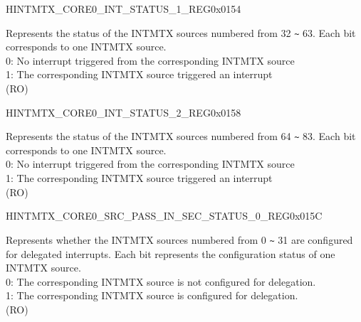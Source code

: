 \begin{register}{H}{INTMTX\_CORE0\_INT\_STATUS\_1\_REG}{0x0154}\label{regdesc:INTMTXCORE0INTSTATUS1REG}
%
\regnewline%
\begin{regdesc}\begin{reglist}
\label{fielddesc:INTMTXCORE0INTSTATUS1}\item [INTMTX\_CORE0\_INT\_STATUS\_1] Represents the status of the INTMTX sources numbered from 32 \verb+~+ 63. Each bit corresponds to one INTMTX source.\\
0: No interrupt triggered from the corresponding INTMTX source \\
1: The corresponding INTMTX source triggered an interrupt \\(RO)
\end{reglist}\end{regdesc}
\end{register}


\begin{register}{H}{INTMTX\_CORE0\_INT\_STATUS\_2\_REG}{0x0158}\label{regdesc:INTMTXCORE0INTSTATUS2REG}
%
%
\regnewline%
\begin{regdesc}\begin{reglist}
\label{fielddesc:INTMTXCORE0INTSTATUS2}\item [INTMTX\_CORE0\_INT\_STATUS\_2] Represents the status of the INTMTX sources numbered from 64 \verb+~+ 83. Each bit corresponds to one INTMTX source.\\
0: No interrupt triggered from the corresponding INTMTX source \\
1: The corresponding INTMTX source triggered an interrupt \\(RO)
\end{reglist}\end{regdesc}
\end{register}


\begin{register}{H}{INTMTX\_CORE0\_SRC\_PASS\_IN\_SEC\_STATUS\_0\_REG}{0x015C}\label{regdesc:INTMTXCORE0SRCPASSINSECSTATUS0REG}
%
\regnewline%
\begin{regdesc}\begin{reglist}
\label{fielddesc:INTMTXCORE0INTSRCPASSINSECSTATUS0}\item [INTMTX\_CORE0\_INT\_SRC\_PASS\_IN\_SEC\_STATUS\_0] Represents whether the INTMTX sources numbered from 0 \verb+~+ 31 are configured for delegated interrupts. Each bit represents the configuration status of one INTMTX source.\\

0: The corresponding INTMTX source is not configured for delegation.\\
1: The corresponding INTMTX source is configured for delegation.\\ (RO)
\end{reglist}\end{regdesc}
\end{register}


